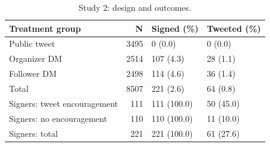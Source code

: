 \begin{table}

\caption{Study 2: design and outcomes.}
\centering
\begin{tabular}[t]{lrll}
\toprule
Treatment group & N & Signed (\%) & Tweeted (\%)\\
\midrule
Public tweet & 3495 & 0 (0.0) & 0 (0.0)\\
Organizer DM & 2514 & 107 (4.3) & 28 (1.1)\\
Follower DM & 2498 & 114 (4.6) & 36 (1.4)\\
Total & 8507 & 221 (2.6) & 64 (0.8)\\
Signers: tweet encouragement & 111 & 111 (100.0) & 50 (45.0)\\
\addlinespace
Signers: no encouragement & 110 & 110 (100.0) & 11 (10.0)\\
Signers: total & 221 & 221 (100.0) & 61 (27.6)\\
\bottomrule
\end{tabular}
\end{table}
